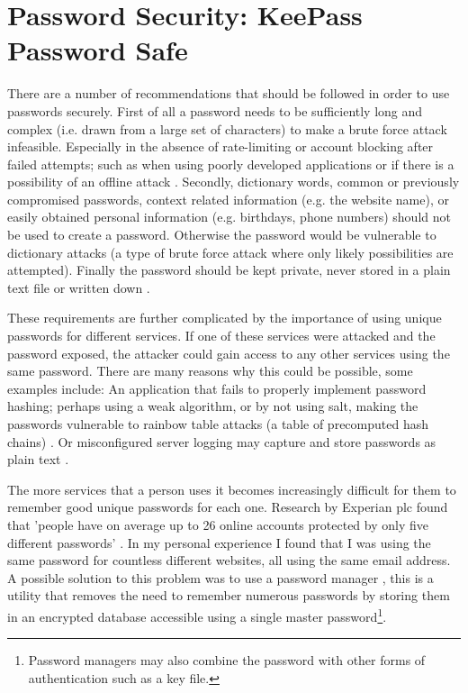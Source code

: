 \documentclass[11pt,a4paper]{scrartcl}
\begin{document}
	
\section*{Password Security: KeePass Password Safe}
\begin{refsection}

There are a number of recommendations that should be followed in order to use passwords securely. 
First of all a password needs to be sufficiently long and complex (i.e. drawn from a large set of characters) to make a brute force attack infeasible. Especially in the absence of rate-limiting or account blocking after failed attempts; such as when using poorly developed applications or if there is a possibility of an offline attack \cite{nist_password_2017}.
Secondly, dictionary words, common or previously compromised passwords, context related information (e.g. the website name), or easily obtained personal information (e.g. birthdays, phone numbers) should not be used to create a password. Otherwise the password would be vulnerable to dictionary attacks (a type of brute force attack where only likely possibilities are attempted).
Finally the password should be kept private, never stored in a plain text file or written down \cite{cern_computer_security_information}.

These requirements are further complicated by the importance of using unique passwords for different services. If one of these services were attacked and the password exposed, the attacker could gain access to any other services using the same password. There are many reasons why this could be possible, some examples include: An application that fails to properly implement password hashing; perhaps using a weak algorithm, or by not using salt, making the passwords vulnerable to rainbow table attacks (a table of precomputed hash chains) \cite{linkedin_leak}. Or misconfigured server logging may capture and store passwords as plain text  \cite{github_logs,twitter_logs}.

The more services that a person uses it becomes increasingly difficult for them to remember good unique passwords for each one.
Research by Experian plc found that 'people have on average up to 26 online accounts protected by only five different passwords' \cite{experian_2016}.
In my personal experience I found that I was using the same password for countless different websites, all using the same email address. 
A possible solution to this problem was to use a password manager \cite{ncsc_pass_managers}, this is a utility that removes the need to remember numerous passwords by storing them in an encrypted database accessible using a single master password\footnote{Password managers may also combine the password with other forms of authentication such as a key file.}.


\end{refsection}
\end{document}
